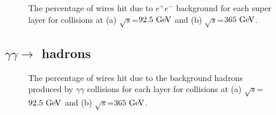 \documentclass{article}
\begin{document}
\begin{figure}[!h]
\hfil
{}
\caption{The percentage of wires hit due to $e^+e^-$ background for each super layer for collisions at (a) $\sqrt{s}$=$92.5\,\mathrm{\,Ge\kern -0.1em V}$ and (b) $\sqrt{s}$=$365\,\mathrm{\,Ge\kern -0.1em V}$.}
\label{fig_IPC}
\end{figure}

\subsection{$\gamma\gamma\rightarrow$ hadrons}

\begin{figure}[!h]
 	\hfil
 	\caption{The percentage of wires hit due to the background hadrons produced by $\gamma\gamma$ collisions for each layer for collisions at (a) $\sqrt{s}$=$92.5\,\mathrm{\,Ge\kern -0.1em V}$ and (b) $\sqrt{s}$=$365\,\mathrm{\,Ge\kern -0.1em V}$.}
 	\label{fig_bckhadrons}
\end{figure}
\end{document}
